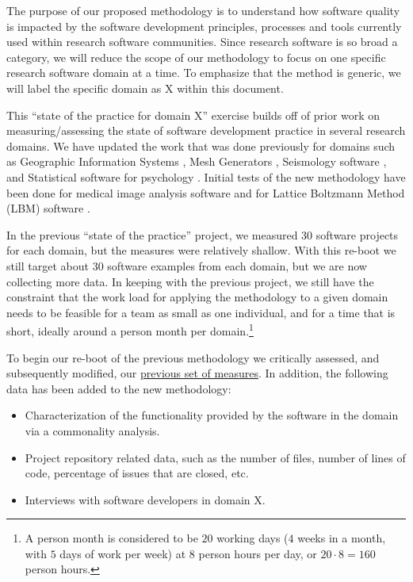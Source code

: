 \documentclass[letterpaper,cleveref]{lipics-v2019}
\begin{document}
The purpose of our proposed methodology is to understand how software quality is
impacted by the software development principles, processes and tools currently
used within research software communities.  Since research software is so broad
a category, we will reduce the scope of our methodology to focus on one specific
research software domain at a time.  To emphasize that the method is generic, we
will label the specific domain as X within this document.  

This ``state of the practice for domain X'' exercise builds off of prior work on
measuring/assessing the state of software development practice in several
research domains.  We have updated the work that was done previously for domains
such as Geographic Information Systems \citep{SmithEtAl2018_arXivGIS}, Mesh
Generators \citep{SmithEtAl2016}, Seismology software \citep{SmithEtAl2018}, and
Statistical software for psychology \citep{SmithEtAl2018_StatSoft}.  Initial
tests of the new methodology have been done for medical image analysis software
\citep{Dong2021} and for Lattice Boltzmann Method (LBM) software
\citep{Michalski2021}.

In the previous ``state of the practice'' project, we measured 30 software
projects for each domain, but the measures were relatively shallow.  With this
re-boot we still target about 30 software examples from each domain, but we are
now collecting more data.  In keeping with the previous project, we still have
the constraint that the work load for applying the methodology to a given domain
needs to be feasible for a team as small as one individual, and for a time that
is short, ideally around a person month per domain.\footnote{A person month is
considered to be $20$ working days ($4$ weeks in a month, with $5$ days of work
per week) at $8$ person hours per day, or $20 \cdot 8 = 160$ person hours.}

To begin our re-boot of the previous methodology we critically assessed, and
subsequently modified, our
\href{https://github.com/adamlazz/DomainX/blob/master/TemplateToGradeSCSoft.pdf}
{previous set of measures}.  In addition, the following data has been added to
the new methodology:

\begin{itemize}
\item Characterization of the functionality provided by the software in the
  domain via a commonality analysis.
\item Project repository related data, such as the number of files, number of
  lines of code, percentage of issues that are closed, etc. 
\item Interviews with software developers in domain X.
\end{itemize}
\end{document}
